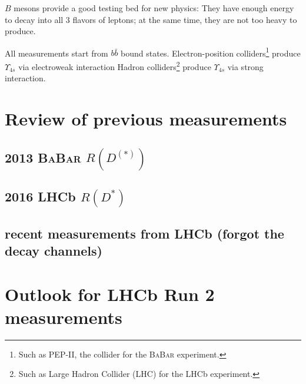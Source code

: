 \documentclass[10pt]{article}
\def\BaBar/{\textsc{BaBar}}
\begin{document}
$B$ mesons provide a good testing bed for new physics:
They have enough energy to decay into all 3 flavors of leptons;
at the same time, they are not too heavy to produce.

All measurements start from $b\bar{b}$ bound states.
Electron-position colliders\footnote{
    Such as PEP-II, the collider for the \BaBar/ experiment.
} produce $\Upsilon_{4s}$ via electroweak interaction
Hadron colliders\footnote{
    Such as Large Hadron Collider (LHC) for the LHCb experiment.
} produce $\Upsilon_{4s}$ via strong interaction.







\section{Review of previous measurements}

\subsection{2013 \BaBar/ $R(D^{(*)})$}

\subsection{2016 LHCb $R(D^{*})$}

\subsection{recent measurements from LHCb (forgot the decay channels)}


\section{Outlook for LHCb Run 2 measurements}



\vspace{5em}
\printbibliography
\end{document}
